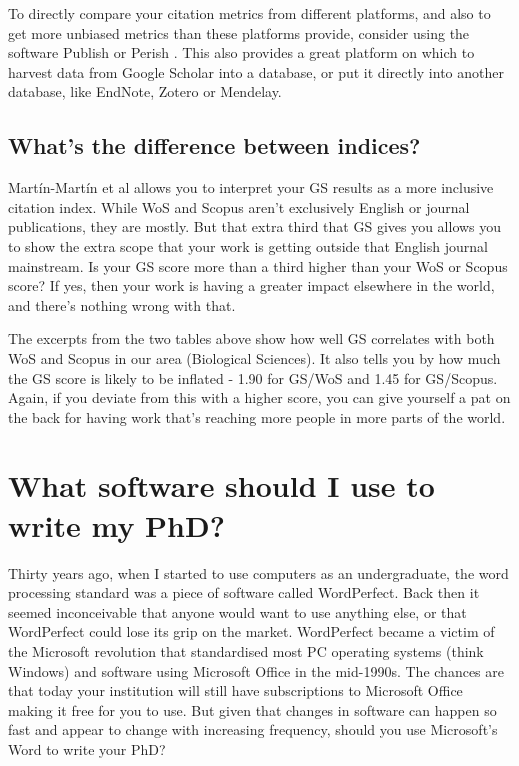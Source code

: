 \documentclass[
]{krantz}
\begin{document}
To directly compare your citation metrics from different platforms, and also to get more unbiased metrics than these platforms provide, consider using the software Publish or Perish \citep{harzing2007publish}. This also provides a great platform on which to harvest data from Google Scholar into a database, or put it directly into another database, like EndNote, Zotero or Mendelay.

\hypertarget{whats-the-difference-between-indices}{%
\subsection{What's the difference between indices?}\label{whats-the-difference-between-indices}}

Martín-Martín et al \citeyearpar{martin-martin2018google} allows you to interpret your GS results as a more inclusive citation index. While WoS and Scopus aren't exclusively English or journal publications, they are mostly. But that extra third that GS gives you allows you to show the extra scope that your work is getting outside that English journal mainstream. Is your GS score more than a third higher than your WoS or Scopus score? If yes, then your work is having a greater impact elsewhere in the world, and there's nothing wrong with that.

The excerpts from the two tables above show how well GS correlates with both WoS and Scopus in our area (Biological Sciences). It also tells you by how much the GS score is likely to be inflated - 1.90 for GS/WoS and 1.45 for GS/Scopus. Again, if you deviate from this with a higher score, you can give yourself a pat on the back for having work that's reaching more people in more parts of the world.

\hypertarget{software}{%
\section{What software should I use to write my PhD?}\label{software}}

Thirty years ago, when I started to use computers as an undergraduate, the word processing standard was a piece of software called WordPerfect. Back then it seemed inconceivable that anyone would want to use anything else, or that WordPerfect could lose its grip on the market. WordPerfect became a victim of the Microsoft revolution that standardised most PC operating systems (think Windows) and software using Microsoft Office in the mid-1990s. The chances are that today your institution will still have subscriptions to Microsoft Office making it free for you to use. But given that changes in software can happen so fast and appear to change with increasing frequency, should you use Microsoft's Word to write your PhD?
\end{document}
